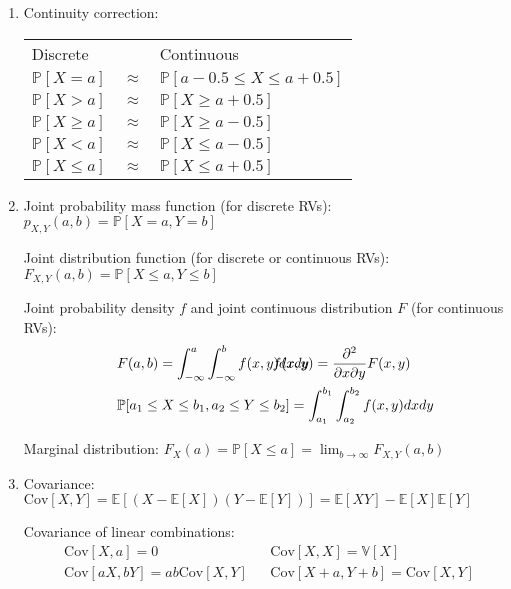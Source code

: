 \documentclass{article}
\begin{document}
\begin{enumerate}
	\item Continuity correction:

		\begin{tabular}{lcl}
			\rule[-1ex]{0pt}{2.5ex} Discrete &  & Continuous \\
			\rule[-1ex]{0pt}{3.5ex} $\mathbb{P}[X=a]$ & $\approx$ & $\mathbb{P}[a-0.5\leq X\leq a+0.5]$ \\
			\rule[-1ex]{0pt}{3.5ex} $\mathbb{P}[X>a]$ & $\approx$ & $\mathbb{P}[X\geq a+0.5]$ \\
			\rule[-1ex]{0pt}{3.5ex} $\mathbb{P}[X\geq a]$ & $\approx$ & $\mathbb{P}[X\geq a-0.5]$ \\
			\rule[-1ex]{0pt}{3.5ex} $\mathbb{P}[X<a]$ & $\approx$ & $\mathbb{P}[X\leq a-0.5]$ \\
			\rule[-1ex]{0pt}{3.5ex} $\mathbb{P}[X\leq a]$ & $\approx$ & $\mathbb{P}[X\leq a+0.5]$
		\end{tabular}
	
	\item Joint probability mass function (for discrete RVs): $p_{X,Y}(a,b)=\mathbb{P}[X=a,Y=b]$
	
		Joint distribution function (for discrete or continuous RVs): $F_{X,Y}(a,b)=\mathbb{P}[X\leq a,Y\leq b]$
		
		Joint probability density $f$ and joint continuous distribution $F$ (for continuous RVs):
		\begin{align*}
			&F(a,b)=\int_{-\infty}^{a}\int_{-\infty}^{b}f(x,y)dxdy &&\hspace*{-4.4cm}f(x,y)=\frac{\partial^2}{\partial x\partial y}F(x,y) \\
			&\mathbb{P}[a_1\leq X\leq b_1, a_2\leq Y\leq b_2]=\int_{a_1}^{b_1}\int_{a_2}^{b_2}f(x,y)dxdy
		\end{align*}
		
		Marginal distribution: $F_X(a)=\mathbb{P}[X\leq a]=\displaystyle\lim_{b\to\infty}F_{X,Y}(a,b)$
	
	\item Covariance: $\mathrm{Cov}[X,Y]=\mathbb{E}\left[(X-\mathbb{E}[X])(Y-\mathbb{E}[Y])\right]=\mathbb{E}[XY]-\mathbb{E}[X]\mathbb{E}[Y]$
		
		Covariance of linear combinations:
		\begin{align*}
			&\mathrm{Cov}[X,a]=0 &&\mathrm{Cov}[X,X]=\mathbb{V}[X] \\
			&\mathrm{Cov}[aX,bY]=ab\mathrm{Cov}[X,Y] &&\mathrm{Cov}[X+a,Y+b]=\mathrm{Cov}[X,Y]
		\end{align*}
		

\end{enumerate}
\end{document}
